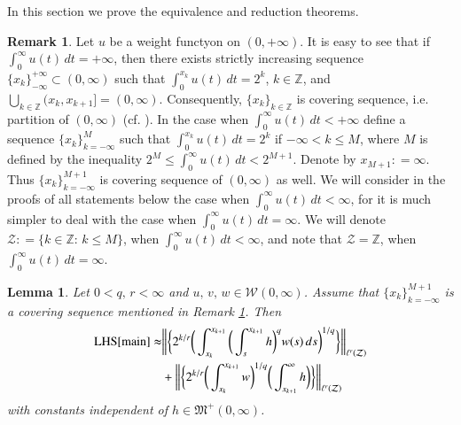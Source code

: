 \documentclass[12pt]{amsart}
\theoremstyle{plain}
\newtheorem{lem}[thm]{Lemma}
\theoremstyle{definition}
\newtheorem{rem}[thm]{Remark}
\numberwithin{thm}{section}
\numberwithin{equation}{section}
\begin{document}
In this section we prove the equivalence and reduction theorems.
\begin{rem}\label{rem.disc.}
Let $u$ be a weight functyon on $(0,+\infty)$. It is easy to see that if $\int_0^{\infty} u(t)\,dt = +\infty$, then there exists strictly increasing sequence $\{x_k\}_{-\infty}^{+\infty} \subset (0,\infty)$ such that $\int_0^{x_k} u(t)\,dt = 2^k$, $k \in {\mathbb Z}$, and $\bigcup_{k \in {\mathbb Z}} (x_k,x_{k+1}] = (0,\infty)$. Consequently, $\{x_k\}_{k \in {\mathbb Z}}$ is covering sequence, i.e. partition of $(0,\infty)$ (cf. \cite{Lai1999}). In the case when $\int_0^{\infty} u(t)\,dt < +\infty$ define a sequence $\{x_k\}_{k = -\infty}^M$ such that $\int_0^{x_k} u(t)\,dt = 2^k$ if $-\infty < k \le M$, where $M$ is defined by the inequality $2^M \le \int_0^{\infty} u(t)\,dt < 2^{M+1}$. Denote by $x_{M+1} : = \infty$. Thus $\{x_k\}_{k = -\infty}^{M+1}$ is covering sequence of $(0,\infty)$ as well. We will consider in the proofs of all statements below the case when $\int_0^{\infty} u(t)\,dt < \infty$, for it is much simpler to deal with the case when $\int_0^{\infty} u(t)\,dt = \infty$. We will denote ${\mathcal Z} : = \{k \in {\mathbb Z}:\, k \le M\}$, when $\int_0^{\infty} u(t)\,dt < \infty$, and note that ${\mathcal Z} = {\mathbb Z}$, when $\int_0^{\infty} u(t)\,dt = \infty$.
\end{rem}

\begin{lem}\label{lem.1.1}
Let $0 < q,\, r < \infty$ and  $u,\,v,\,w \in {\mathcal W}{(0,\infty)}$.
Assume that $\{x_k\}_{k=-\infty}^{M + 1}$ is a covering sequence mentioned in Remark \ref{rem.disc.}. Then
\begin{align}
{\operatorname{LHS}}{\eqref{main}} \thickapprox &  \bigg\| \bigg\{  2^{k / r} \bigg(
\int_{x_k}^{x_{k+1}} \bigg( \int_s^{x_{k+1}} h \bigg)^q
w(s)\,ds\bigg)^{ 1 / q}\bigg\} \bigg\|_{\ell^r({\mathcal Z})} \notag\\
&  +  \bigg\| \bigg\{  2^{k / r} \bigg(
\int_{x_k}^{x_{k+1}} w \bigg)^{1 / q} \bigg( \int_{x_{k+1}}^{\infty} h
\bigg)\bigg\} \bigg\|_{\ell^r({\mathcal Z})}
\end{align}
with constants independent of $h \in {\mathfrak M}^+(0,\infty)$. 
\end{lem}
\end{document}
